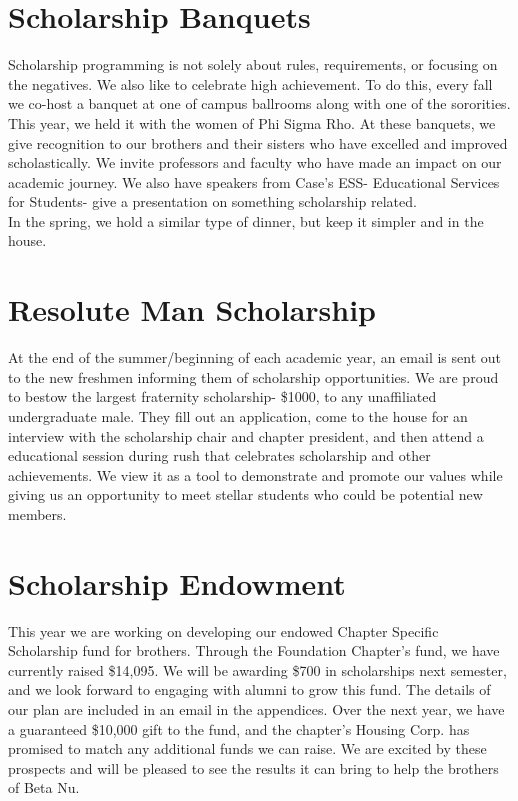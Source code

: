   \section*{Scholarship Banquets}
    Scholarship programming is not solely about rules, requirements, or focusing on the negatives. We also like to celebrate high achievement. To do this, every fall we co-host a banquet at one of campus ballrooms along with one of the sororities. This year, we held it with the women of Phi Sigma Rho. At these banquets, we give recognition to our brothers and their sisters who have excelled and improved scholastically. We invite professors and faculty who have made an impact on our academic journey. We also have speakers from Case's ESS- Educational Services for Students- give a presentation on something scholarship related. \\

    In the spring, we hold a similar type of dinner, but keep it simpler and in the house.
    
  \section*{Resolute Man Scholarship}
    At the end of the summer/beginning of each academic year, an email is sent out to the new freshmen informing them of scholarship opportunities. We are proud to bestow the largest fraternity scholarship- \$1000, to any unaffiliated undergraduate male. They fill out an application, come to the house for an interview with the scholarship chair and chapter president, and then attend a educational session during rush that celebrates scholarship and other achievements. We view it as a tool to demonstrate and promote our values while giving us an opportunity to meet stellar students who could be potential new members.
    
  \section*{Scholarship Endowment}
  
    This year we are working on developing our endowed Chapter Specific Scholarship fund for brothers. Through the Foundation Chapter's fund, we have currently raised \$14,095. We will be awarding \$700 in scholarships next semester, and we look forward to engaging with alumni to grow this fund. The details of our plan are included in an email in the appendices.  Over the next year, we have a guaranteed \$10,000 gift to the fund, and the chapter's Housing Corp. has promised to match any additional funds we can raise. We are excited by these prospects and will be pleased to see the results it can bring to help the brothers of Beta Nu.
    
